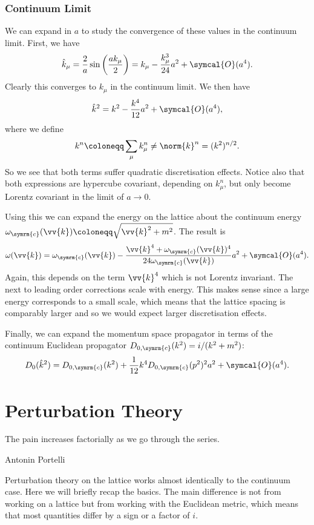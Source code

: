 \documentclass[fleqn]{NotesClass}
\newcommand{\order}{\symcal{O}}
\begin{document}
    \subsection{Continuum Limit}
    We can expand in \(a\) to study the convergence of these values in the continuum limit.
    First, we have
    \begin{equation}
        \hat{k}_\mu = \frac{2}{a}\sin\left( \frac{ak_\mu}{2} \right) = k_\mu - \frac{k_\mu^3}{24}a^2 + \order(a^4).
    \end{equation}
    Clearly this converges to \(k_\mu\) in the continuum limit.
    We then have
    \begin{equation}
        \hat{k}^2 = k^2 - \frac{k^4}{12}a^2 + \order(a^4),
    \end{equation}
    where we define
    \begin{equation}
        k^n \coloneqq \sum_\mu k_\mu^n \ne \norm{k}^n = (k^2)^{n/2}.
    \end{equation}
    So we see that both terms suffer quadratic discretisation effects.
    Notice also that both expressions are hypercube covariant, depending on \(k_\mu^n\), but only become Lorentz covariant in the limit of \(a \to 0\).
    
    Using this we can expand the energy on the lattice about the continuum energy \(\omega_{\symrm{c}}(\vv{k}) \coloneqq \sqrt{\vv{k}^2 + m^2}\).
    The result is
    \begin{equation}
        \omega(\vv{k}) = \omega_{\symrm{c}}(\vv{k}) - \frac{\vv{k}^4 + \omega_{\symrm{c}}(\vv{k})^4}{24\omega_{\symrm{c}}(\vv{k})} a^2 + \order(a^4).
    \end{equation}
    Again, this depends on the term \(\vv{k}^4\) which is not Lorentz invariant.
    The next to leading order corrections scale with energy.
    This makes sense since a large energy corresponds to a small scale, which means that the lattice spacing is comparably larger and so we would expect larger discretisation effects.
    
    Finally, we can expand the momentum space propagator in terms of the continuum Euclidean propagator \(D_{0, \symrm{c}}(k^2) = i/(k^2 + m^2)\):
    \begin{equation}
        D_0(\hat{k}^2) = D_{0, \symrm{c}}(k^2) + \frac{1}{12} k^4D_{0,\symrm{c}}(p^2)^2 a^2 + \order(a^4).
    \end{equation}
    
    \chapter{Perturbation Theory}
    \epigraph{The pain increases factorially as we go through the series.}{Antonin Portelli}
    Perturbation theory on the lattice works almost identically to the continuum case.
    Here we will briefly recap the basics.
    The main difference is not from working on a lattice but from working with the Euclidean metric, which means that most quantities differ by a sign or a factor of \(i\).
    
\end{document}
